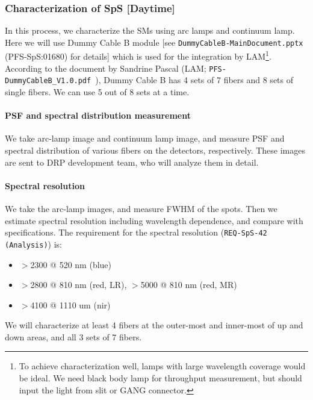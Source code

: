 \subsubsection{Characterization of SpS [Daytime]}\label{secflow:SpSchar}

In this process, we characterize the SMs using arc lamps and continuum lamp.
Here we will use Dummy Cable B module [see {\tt DummyCableB-MainDocument.pptx} (PFS-SpS:01680) for details] which is used for the integration by LAM\footnote{To achieve characterization well, lamps with large wavelength coverage would be ideal. We need black body lamp for throughput measurement, but should input the light from slit or GANG connector.}.
According to the document by Sandrine Pascal (LAM; {\tt PFS-DummyCableB\_V1.0.pdf }), Dummy Cable B has 4 sets of 7 fibers and 8 sets of single fibers.
We can use 5 out of 8 sets at a time.

\paragraph{PSF and spectral distribution measurement}
We take arc-lamp image and continuum lamp image, and measure PSF and spectral distribution of various fibers on the detectors, respectively.
These images are sent to DRP development team, who will analyze them in detail.

\paragraph{Spectral resolution}
We take the arc-lamp images, and  measure FWHM of the spots.
Then we estimate spectral resolution including wavelength dependence, and compare with specifications.
The requirement for the spectral resolution ({\tt REQ-SpS-42 (Analysis)}) is:
\begin{itemize}
\item $>$2300 @ 520 nm (blue)
\item $>$2800 @ 810 nm (red, LR),  $>$5000 @ 810 nm (red, MR)
\item $>$4100 @ 1110 um (nir)
\end{itemize}
We will characterize at least 4 fibers at the outer-most and inner-most of up and down areas, and all 3 sets of 7 fibers.

